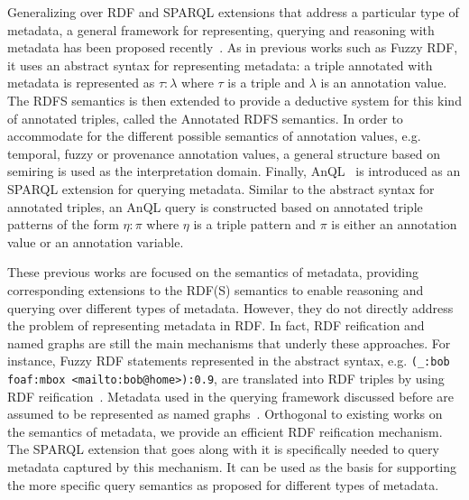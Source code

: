 Generalizing over RDF and SPARQL extensions that address a particular type of metadata, a general framework for representing, querying and reasoning with metadata has been proposed recently~\cite{DBLP:journals/ws/ZimmermannLPS12}. As in previous works such as Fuzzy RDF, it uses an abstract syntax for representing metadata: a triple annotated with metadata is represented as $\tau: \lambda$ where $\tau$ is a triple and $\lambda$ is an annotation value. The RDFS semantics is then extended to provide a deductive system for
this kind of annotated triples, called the Annotated RDFS semantics. In order to accommodate for the different possible semantics of annotation values, e.g. temporal, fuzzy or provenance annotation values, a general structure based on semiring is used as the interpretation domain. Finally, AnQL~\cite{DBLP:conf/semweb/LopesPSZ10} is introduced as an SPARQL extension for querying metadata. Similar to the abstract syntax for annotated triples, an AnQL query is constructed based on annotated triple patterns of the form  $\eta : \pi$ where $\eta$ is a triple pattern and $\pi$ is either an annotation value or an annotation variable. 

These previous works are focused on the semantics of metadata, providing corresponding extensions to the RDF(S) semantics to enable reasoning and querying over different types of metadata. However, they do not directly address the problem of representing metadata in RDF. In fact, RDF reification and named graphs are still the main mechanisms that underly these approaches. For instance, Fuzzy RDF statements represented in the abstract syntax, e.g. \verb+(_:bob foaf:mbox <mailto:bob@home>):0.9+, are translated into RDF triples by using RDF reification~\cite{swap2004}. Metadata used in the querying framework discussed before are assumed to be represented as named graphs~\cite{DBLP:conf/www/SchuelerSST08}. Orthogonal to existing works on the semantics of metadata, we provide an efficient RDF reification mechanism. The SPARQL extension that goes along with it is specifically needed to query metadata captured by this mechanism. It can be used as the basis for supporting the more specific query semantics as proposed for different types of metadata. 



